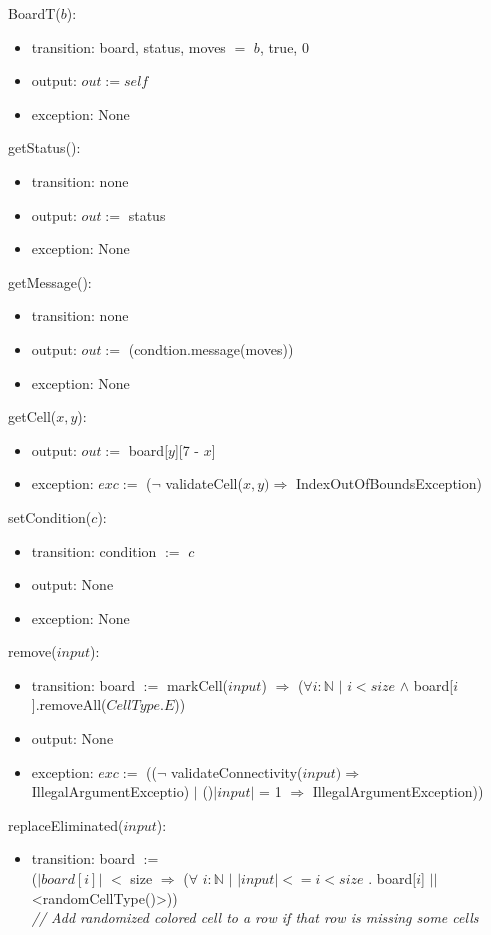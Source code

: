 \documentclass[12pt]{article}
\begin{document}
\noindent BoardT($b$):
\begin{itemize}
\item transition: board, status, moves $=$ $b$, true, 0
\item output: $out := \mathit{self}$
\item exception: None
\end{itemize}

\noindent getStatus():
\begin{itemize}
\item transition: none
\item output: $out :=$ status
\item exception: None
\end{itemize}

\noindent getMessage():
\begin{itemize}
\item transition: none
\item output: $out :=$ (condtion.message(moves))
\item exception: None
\end{itemize}

\noindent getCell($x, y$):
\begin{itemize}
\item output: $out :=$ board[$y$][7 - $x$]
\item exception: $exc :=$ ($\neg$ validateCell($x, y) \Rightarrow$ IndexOutOfBoundsException)
\end{itemize}

\noindent setCondition($c$):
\begin{itemize}
\item transition: condition $:=$ $c$
\item output: None
\item exception: None
\end{itemize}

\noindent remove($input$):
\begin{itemize}
  \item transition: board $:=$ markCell($input$) $\Rightarrow$ ($\forall i : \mathbb{N}$ $|$ $i < size$ $\wedge$ board[$i$].removeAll($CellType.E$))
  \item output: None
  \item exception: $exc :=$ (($\neg$ validateConnectivity($input) \Rightarrow$ IllegalArgumentExceptio) $|$ ()$|input|$ = 1 $\Rightarrow$ IllegalArgumentException))
\end{itemize}

\noindent replaceEliminated($input$):
\begin{itemize}
\item transition: board $:=$\\
  ($|board[i]|$ $<$ size $\Rightarrow$ ($\forall$ $i : \mathbb{N}$ $|$ $|input| <= i < size$ . board[$i$] $||$ <randomCellType()>)) \\
  \medskip
  \textit{// Add randomized colored cell to a row if that row is missing some cells}
\end{itemize}
\end{document}
